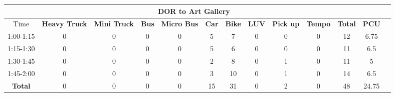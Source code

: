 \begin{landscape}
\begin{table}[h!]
\begin{tabular}{|c|c|c|c|c|c|c|c|c|c|c|c|c|}
    \hline
    \multicolumn{12}{|c|}{\textbf{DOR to Art Gallery}} \\
    \hline
        Time & \textbf{Heavy Truck} & \textbf{Mini Truck} & \textbf{Bus} & \textbf{Micro Bus} & \textbf{Car} & \textbf{Bike} & \textbf{LUV} & \textbf{Pick up} & \textbf{Tempo} & \textbf{\textbf{Total}} & \textbf{PCU} \\
    \hline
1:00-1:15	&0	&0	&0	&0	&5	&7	&0	&0	&0	&12	&6.75 \\ \hline
1:15-1:30	&0	&0	&0	&0	&5	&6	&0	&0	&0	&11	&6.5 \\ \hline
1:30-1:45	&0	&0	&0	&0	&2	&8	&0	&1	&0	&11	&5 \\ \hline
1:45-2:00	&0	&0	&0	&0	&3	&10	&0	&1	&0	&14	&6.5 \\ \hline
\textbf{Total}	&0	&0	&0	&0	&15	&31	&0	&2	&0	&48	&24.75 \\ \hline

\end{tabular}

\end{table}
\end{landscape}


